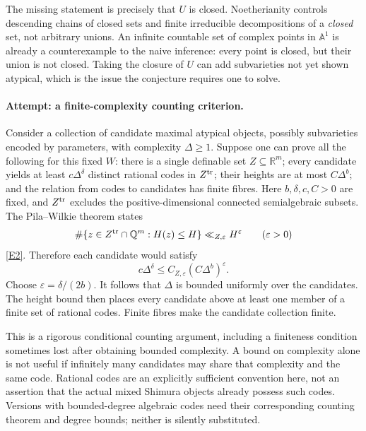 \documentclass[11pt,a4paper]{article}
\numberwithin{equation}{section}
\newcommand{\Q}{\mathbb{Q}}
\newcommand{\R}{\mathbb{R}}
\newcommand{\A}{\mathbb{A}}
\newcommand{\eref}[2]{\hyperlink{extra:#1:#2}{[E#2]}}
\begin{document}
The missing statement is precisely that $U$ is closed. Noetherianity
controls descending chains of closed sets and finite irreducible
decompositions of a \emph{closed} set, not arbitrary unions. An infinite
countable set of complex points in $\A^1$ is already a counterexample to
the naive inference: every point is closed, but their union is not closed.
Taking the closure of $U$ can add subvarieties not yet shown atypical,
which is the issue the conjecture requires one to solve.

\paragraph{Attempt: a finite-complexity counting criterion.}
Consider a collection of candidate maximal atypical objects, possibly
subvarieties encoded by parameters, with complexity $\Delta\geq1$.
Suppose one can prove all the following for this fixed $W$: there is a
single definable set $Z\subseteq\R^m$; every candidate yields at least
$c\Delta^\delta$ distinct rational codes in $Z^{\rm tr}$; their heights
are at most $C\Delta^b$; and the relation from codes to candidates has
finite fibres. Here $b,\delta,c,C>0$ are fixed, and $Z^{\rm tr}$ excludes
the positive-dimensional connected semialgebraic subsets.
The Pila--Wilkie theorem states
\[
 \#\{z\in Z^{\rm tr}\cap\Q^m:H(z)\leq H\}\ll_{Z,\varepsilon}H^\varepsilon
 \qquad(\varepsilon>0)
\]
\eref{82}{2}. Therefore each candidate would satisfy
\[
 c\Delta^\delta\leq C_{Z,\varepsilon}(C\Delta^b)^\varepsilon.
\]
Choose $\varepsilon=\delta/(2b)$. It follows that $\Delta$ is bounded
uniformly over the candidates. The height bound then places every candidate
above at least one member of a finite set of rational codes. Finite fibres
make the candidate collection finite.

This is a rigorous conditional counting argument, including a finiteness
condition sometimes lost after obtaining bounded complexity. A bound on
complexity alone is not useful if infinitely many candidates may share
that complexity and the same code. Rational codes are an explicitly
sufficient convention here, not an assertion that the actual mixed Shimura
objects already possess such codes. Versions with bounded-degree algebraic
codes need their corresponding counting theorem and degree bounds; neither
is silently substituted.
\end{document}
